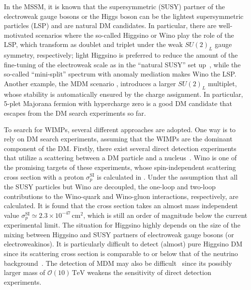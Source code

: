 \documentclass[12pt,twoside,book]{article}
\begin{document}
In the MSSM, it is known that the supersymmetric (SUSY) partner of the electroweak gauge bosons or the Higgs boson can be the lightest supersymmetric particles (LSP) and are natural DM candidates.
In particular, there are well-motivated scenarios where the so-called Higgsino or Wino play the role of the LSP, which transform as doublet and triplet under the weak $SU(2)_L$ gauge symmetry, respectively; light Higgsino is preferred to reduce the amount of the fine-tuning of the electroweak scale as in the ``natural SUSY'' set up~\cite{Kitano:2005wc, Brust:2011tb, Papucci:2011wy, Baer:2012uy}, while the so-called ``mini-split'' spectrum \cite{Wells:2003tf, Wells:2004di, ArkaniHamed:2004fb, Giudice:2004tc, ArkaniHamed:2004yi, ArkaniHamed:2005yv} with anomaly mediation \cite{Randall:1998uk, Giudice:1998xp} makes Wino the LSP.
Another example, the MDM scenario \cite{Cirelli:2005uq, Cirelli:2007xd, Cirelli:2009uv}, introduces a larger $SU(2)_L$ multiplet, whose stability is automatically ensured by the charge assignment.
In particular, 5-plet Majorana fermion with hypercharge zero is a good DM candidate that escapes from the DM search experiments so far.

To search for WIMPs, several different approaches are adopted.
One way is to rely on DM search experiments, assuming that the WIMPs are the dominant component of the DM.
Firstly, there exist several direct detection experiments that utilize a scattering between a DM particle and a nucleus~\cite{Akerib:2016vxi, Cui:2017nnn, Aprile:2018dbl}.
Wino is one of the promising targets of these experiments, whose spin-independent scattering cross section with a proton $\sigma_p^{\mathrm{SI}}$ is calculated in \cite{Hisano:2010fy, Hisano:2012wm, Hisano:2015rsa, Hill:2011be, Hill:2013hoa}.
Under the assumption that all the SUSY particles but Wino are decoupled, the one-loop and two-loop contributions to the Wino-quark and Wino-gluon interactions, respectively, are calculated.
It is found that the cross section takes an almost mass independent value $\sigma_p^{\mathrm{SI}} \simeq 2.3 \times 10^{-47}\,\mathrm{cm}^2$, which is still an order of magnitude below the current experimental limit.
The situation for Higgsino highly depends on the size of the mixing between Higgsino and SUSY partners of electroweak gauge bosons (or electroweakinos).
It is particularly difficult to detect (almost) pure Higgsino DM since its scattering cross section is comparable to or below that of the neutrino background~\cite{Hisano:2012wm}.
The detection of MDM may also be difficult~\cite{Hisano:2011cs} since its possibly larger mass of $\mathcal{O} (10)\,\mathrm{TeV}$ weakens the sensitivity of direct detection experiments.
\end{document}
